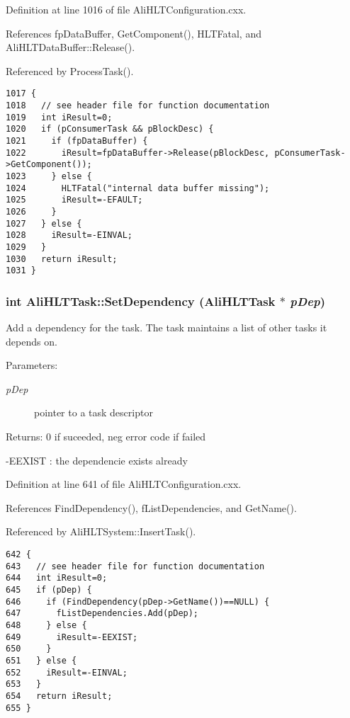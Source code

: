 Definition at line 1016 of file Ali\-HLTConfiguration.cxx.

References fp\-Data\-Buffer, Get\-Component(), HLTFatal, and Ali\-HLTData\-Buffer::Release().

Referenced by Process\-Task().

\footnotesize\begin{verbatim}1017 {
1018   // see header file for function documentation
1019   int iResult=0;
1020   if (pConsumerTask && pBlockDesc) {
1021     if (fpDataBuffer) {
1022       iResult=fpDataBuffer->Release(pBlockDesc, pConsumerTask->GetComponent());
1023     } else {
1024       HLTFatal("internal data buffer missing");
1025       iResult=-EFAULT;
1026     }
1027   } else {
1028     iResult=-EINVAL;
1029   }
1030   return iResult;
1031 }
\end{verbatim}\normalsize 


\subsubsection{\setlength{\rightskip}{0pt plus 5cm}int Ali\-HLTTask::Set\-Dependency ({\bf Ali\-HLTTask} $\ast$ {\em p\-Dep})}\label{classAliHLTTask_a11}


Add a dependency for the task. The task maintains a list of other tasks it depends on. \begin{Desc}
\item[Parameters:]
\begin{description}
\item[{\em p\-Dep}]pointer to a task descriptor \end{description}
\end{Desc}
\begin{Desc}
\item[Returns:]0 if suceeded, neg error code if failed \par
 -EEXIST : the dependencie exists already \end{Desc}


Definition at line 641 of file Ali\-HLTConfiguration.cxx.

References Find\-Dependency(), f\-List\-Dependencies, and Get\-Name().

Referenced by Ali\-HLTSystem::Insert\-Task().

\footnotesize\begin{verbatim}642 {
643   // see header file for function documentation
644   int iResult=0;
645   if (pDep) {
646     if (FindDependency(pDep->GetName())==NULL) {
647       fListDependencies.Add(pDep);
648     } else {
649       iResult=-EEXIST;
650     }
651   } else {
652     iResult=-EINVAL;
653   }
654   return iResult;
655 }
\end{verbatim}\normalsize 


